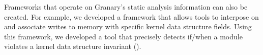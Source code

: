\documentclass{sigplanconf}
\begin{document}
Frameworks that operate on Granary's static analysis information can also be created. For example, we developed a framework that allows tools to interpose on and associate writes to memory with specific kernel data structure fields. Using this framework, we developed a tool that precisely detects if/when a module violates a kernel data structure invariant ().







\end{document}
